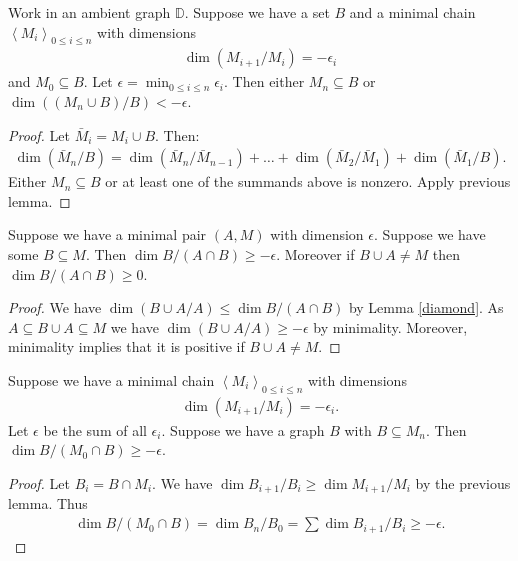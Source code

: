 \documentclass{amsart}
\newcommand{\DB}{\mathbb D}
\newcommand{\agl}[1]{\left\langle #1 \right\rangle}
\begin{document}
\begin{Lemma}	\label{chain_lemma}
  Work in an ambient graph $\DB$.
  Suppose we have a set $B$ and a minimal chain  $\agl{M_i}_{0 \leq i \leq n}$ with dimensions
  \begin{align*}
    \dim(M_{i+1}/M_i) = -\epsilon_i
  \end{align*}
  and $M_0 \subseteq B$.
  Let $\epsilon = \min_{0 \leq i \leq n} \epsilon_i$.
  Then either $M_n \subseteq B$ or $\dim((M_n \cup B)/B) < -\epsilon$.
\end{Lemma}

\begin{proof}
  Let $\bar M_i = M_i \cup B$. Then:
  \begin{align*}
    \dim(\bar M_n/B) = \dim(\bar M_n/\bar M_{n-1}) + \ldots + \dim(\bar M_2/\bar M_1) + \dim(\bar M_1/B).
  \end{align*}
  Either $M_n \subseteq B$ or at least one of the summands above is nonzero.
  Apply previous lemma.
\end{proof}

\begin{Lemma} \label{minimal_subset}
  Suppose we have a minimal pair $(A, M)$ with dimension $\epsilon$.
  Suppose we have some $B \subseteq M$.
  Then $\dim B / (A \cap B) \geq -\epsilon$.
  Moreover if $B \cup A \neq M$ then $\dim B / (A \cap B) \geq 0$.
\end{Lemma}

\begin{proof}
  We have $\dim (B \cup A / A) \leq \dim B / (A \cap B)$ by Lemma \ref{diamond}.
  As $A \subseteq B \cup A \subseteq M$ we have $\dim (B \cup A / A) \geq -\epsilon$ by minimality.
  Moreover, minimality implies that it is positive if $B \cup A \neq M$.
\end{proof}

\begin{Lemma} \label{chain_intersect}
  Suppose we have a minimal chain  $\agl{M_i}_{0 \leq i \leq n}$ with dimensions
  \begin{align*}
    \dim(M_{i+1}/M_i) = -\epsilon_i.
  \end{align*}
  Let $\epsilon$ be the sum of all $\epsilon_i$.
  Suppose we have a graph $B$ with $B \subseteq M_n$.
  Then $\dim B / (M_0 \cap B) \geq -\epsilon$.
\end{Lemma}

\begin{proof}
  Let $B_i = B \cap M_i$.
  We have $\dim B_{i+1}/B_i \geq \dim M_{i+1}/M_i$ by the previous lemma.
  Thus
  \begin{align*}
    \dim B / (M_0 \cap B) = \dim B_n / B_0 = \sum \dim B_{i+1}/B_i \geq -\epsilon.
  \end{align*}
\end{proof}
\end{document}
